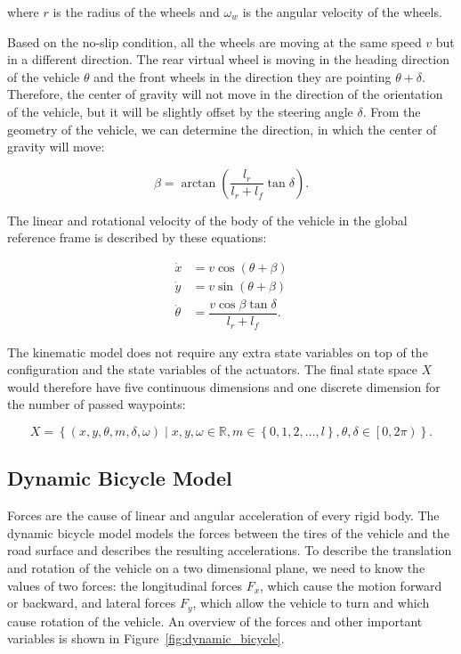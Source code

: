 where $r$ is the radius of the wheels and $\omega_w$ is the angular velocity of the wheels.

Based on the no-slip condition, all the wheels are moving at the same speed $v$ but in a different direction. The rear virtual wheel is moving in the heading direction of the vehicle $\theta$ and the front wheels in the direction they are pointing $\theta + \delta$. Therefore, the center of gravity will not move in the direction of the orientation of the vehicle, but it will be slightly offset by the steering angle $\delta$. From the geometry of the vehicle, we can determine the direction, in which the center of gravity will move:

\begin{equation*}
	\beta=\arctan\left(\dfrac{l_r}{l_r+l_f}\tan\delta\right).
\end{equation*}

The linear and rotational velocity of the body of the vehicle in the global reference frame is described by these equations:

\begin{equation*}
\begin{aligned}
\dot{x}&=v\cos\left(\theta + \beta\right) \\
\dot{y}&=v\sin\left(\theta + \beta\right) \\
\dot{\theta}&=\dfrac{v\cos\beta\tan\delta}{l_r + l_f}.
\end{aligned}
\end{equation*}

The kinematic model does not require any extra state variables on top of the configuration and the state variables of the actuators. The final state space $X$ would therefore have five continuous dimensions and one discrete dimension for the number of passed waypoints:

\begin{equation*}
	X=\left\{\left(x,y,\theta,m,\delta,\omega\right)\mid x,y,\omega\in\mathbb{R},m\in\left\{0,1,2,\dots,l\right\},\theta,\delta\in\left[0, 2\pi\right)\right\}.
\end{equation*}

\subsection{Dynamic Bicycle Model}

Forces are the cause of linear and angular acceleration of every rigid body. The dynamic bicycle model models the forces between the tires of the vehicle and the road surface and describes the resulting accelerations. To describe the translation and rotation of the vehicle on a two dimensional plane, we need to know the values of two forces: the longitudinal forces $F_x$, which cause the motion forward or backward, and lateral forces $F_y$, which allow the vehicle to turn and which cause rotation of the vehicle. An overview of the forces and other important variables is shown in Figure~\ref{fig:dynamic_bicycle}.

